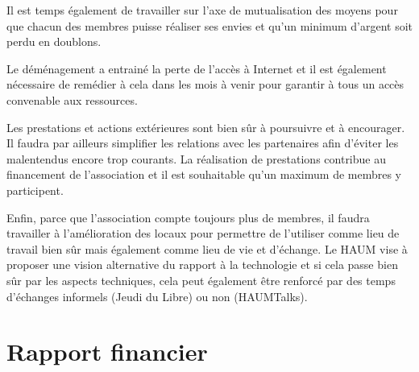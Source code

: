 \documentclass[11pt]{article}
\begin{document}
Il est temps également de travailler sur l'axe de mutualisation des moyens pour que chacun des membres puisse réaliser ses envies et qu'un minimum d'argent soit perdu en doublons.

Le déménagement a entrainé la perte de l'accès à Internet et il est également nécessaire de remédier à cela dans les mois à venir pour garantir à tous un accès convenable aux ressources.

Les prestations et actions extérieures sont bien sûr à poursuivre et à encourager. Il faudra par ailleurs simplifier les relations avec les partenaires afin d'éviter les malentendus encore trop courants. La réalisation de prestations contribue au financement de l'association et il est souhaitable qu'un maximum de membres y participent.

Enfin, parce que l'association compte toujours plus de membres, il faudra travailler à l'amélioration des locaux pour permettre de l'utiliser comme lieu de travail bien sûr mais également comme lieu de vie et d'échange. Le HAUM vise à proposer une vision alternative du rapport à la technologie et si cela passe bien sûr par les aspects techniques, cela peut également être renforcé par des temps d'échanges informels (Jeudi du Libre) ou non (HAUMTalks).

\section{Rapport financier}
\end{document}

